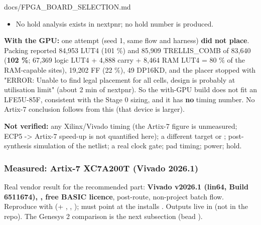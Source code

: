 \begin{relocated}{docs/FPGA_BOARD_SELECTION.md}
\begin{itemize}
  ordinary logic. The worst cross-domain figures nextpnr printed (44.99
  / 47.49 / 51.89 MHz in seeds 1 / 2 / 3:  falling edge
  -\textgreater{} , a JTAG/DFT path, and in seed 3 a
  harness shift-register flop -\textgreater{}  reset
  fanout) are in the same band as the domain Fmax and are not separate
  limiters. The relations between the two main SoC domains
  ( \textless-\textgreater{} )
  printed only max-delay values (seed 1: 2.77 ns and 1.84 ns), no
  failing frequency.
\item
  No hold analysis exists in nextpnr; no hold number is produced.
\end{itemize}

\textbf{With the GPU:} one attempt (seed 1, same flow and harness)
\textbf{did not place}. Packing reported 84,953 LUT4 (101 \%) and 85,909
TRELLIS\_\allowbreak{}COMB of 83,640 (\textbf{102 \%}; 67,369 logic LUT4
+ 4,888 carry + 8,464 RAM LUT4 = 80 \% of the RAM-capable sites), 19,202
FF (22 \%), 49 DP16KD, and the placer stopped with "ERROR: Unable to
find legal placement for all cells, design is probably at utilisation
limit" (about 2 min of nextpnr). So the with-GPU build does not fit an
LFE5U-85F, consistent with the Stage 0 sizing, and it has \textbf{no}
timing number. No Artix-7 conclusion follows from this (that device is
larger).

\textbf{Not verified:} any Xilinx/\allowbreak{}Vivado timing (the
Artix-7 figure is unmeasured; ECP5 -\textgreater{} Artix-7 speed-up is
not quantified here); a different  target or
; post-synthesis simulation of the netlist; a real clock
gate; pad timing; power; hold.

\subsubsection{Measured: Artix-7 XC7A200T (Vivado 2026.1)}\label{tm:dec:fpga-board-selection:measured-artix-7-xc7a200t-vivado-20261}

Real vendor result for the recommended part: \textbf{Vivado v2026.1
(lin64, Build 6511674), , free BASIC licence},
post-route, non-project batch flow. Reproduce with
 (+ ,
, );
 must point at the install\textquotesingle s
. Outputs live in 
(not in the repo). The Genesys 2 comparison is the next subsection (bead
).


\end{relocated}
